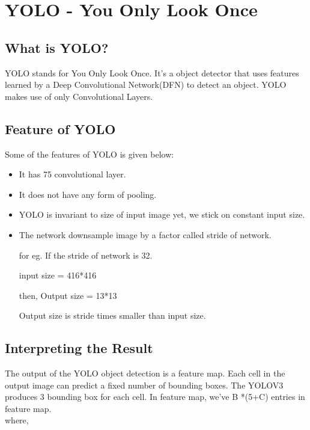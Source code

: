         \section{YOLO - You Only Look Once}
            \subsection{What is YOLO?}
                YOLO stands for You Only Look Once. It's a object detector that uses features learned by a Deep Convolutional Network(DFN) to detect an object. YOLO makes use of only Convolutional Layers.   
            \subsection{Feature of YOLO}
                Some of the features of YOLO is given below:
                \begin{itemize}
                    \item It has 75 convolutional layer.
 	                \item It does not have any form of pooling.
 	                \item YOLO is invariant to size of input image yet, we stick on constant input size.
 	                \item The network downsample image by a factor called stride of network.

                        \tab for eg. If the stride of network is 32.

                        \tab input size = 416*416

                        \tab then, Output size = 13*13
                         
                        \tab Output size is stride times smaller than input size.
                         
                \end{itemize}
                
            \subsection{Interpreting the Result}
                The output of the YOLO object detection is a feature map. Each cell in the output image can predict a fixed number of bounding boxes. The YOLOV3 produces 3 bounding box for each cell.
                In feature map, we've B *(5+C) entries in feature map.\\
                \tab where,


